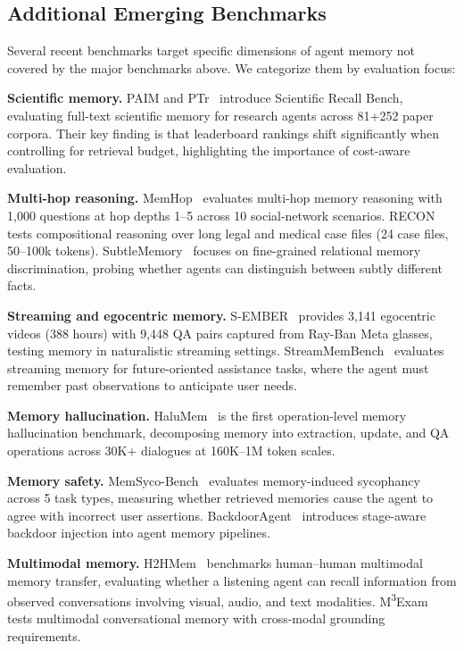 \subsection{Additional Emerging Benchmarks}

Several recent benchmarks target specific dimensions of agent memory not covered by the major benchmarks above. We categorize them by evaluation focus:

\textbf{Scientific memory.} PAIM and PTr~\cite{Unknown2026PAIM} introduce Scientific Recall Bench, evaluating full-text scientific memory for research agents across 81+252 paper corpora. Their key finding is that leaderboard rankings shift significantly when controlling for retrieval budget, highlighting the importance of cost-aware evaluation.

\textbf{Multi-hop reasoning.} MemHop~\cite{Unknown2026MemHop} evaluates multi-hop memory reasoning with 1,000 questions at hop depths 1--5 across 10 social-network scenarios. RECON~\cite{Unknown2026RECON} tests compositional reasoning over long legal and medical case files (24 case files, 50--100k tokens). SubtleMemory~\cite{Unknown2026SubtleMemory} focuses on fine-grained relational memory discrimination, probing whether agents can distinguish between subtly different facts.

\textbf{Streaming and egocentric memory.} S-EMBER~\cite{Unknown2026SEMBER} provides 3,141 egocentric videos (388 hours) with 9,448 QA pairs captured from Ray-Ban Meta glasses, testing memory in naturalistic streaming settings. StreamMemBench~\cite{Unknown2026StreamMemBench} evaluates streaming memory for future-oriented assistance tasks, where the agent must remember past observations to anticipate user needs.

\textbf{Memory hallucination.} HaluMem~\cite{Unknown2025HaluMem} is the first operation-level memory hallucination benchmark, decomposing memory into extraction, update, and QA operations across 30K+ dialogues at 160K--1M token scales.

\textbf{Memory safety.} MemSyco-Bench~\cite{Unknown2026MemSycoBench} evaluates memory-induced sycophancy across 5 task types, measuring whether retrieved memories cause the agent to agree with incorrect user assertions. BackdoorAgent~\cite{Unknown2025BackdoorAgent} introduces stage-aware backdoor injection into agent memory pipelines.

\textbf{Multimodal memory.} H2HMem~\cite{Unknown2026H2HMem} benchmarks human--human multimodal memory transfer, evaluating whether a listening agent can recall information from observed conversations involving visual, audio, and text modalities. M\textsuperscript{3}Exam~\cite{Unknown2026M3Exam} tests multimodal conversational memory with cross-modal grounding requirements.

